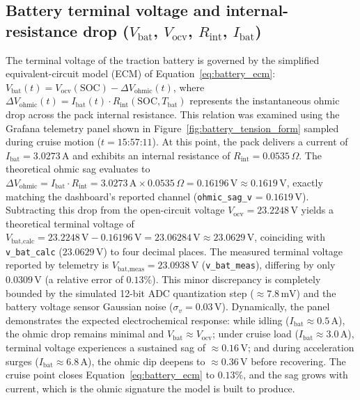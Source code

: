 \subsection{Battery terminal voltage and internal-resistance drop (\texorpdfstring{$V_{\mathrm{bat}}$, $V_{\mathrm{ocv}}$, $R_{\mathrm{int}}$, $I_{\mathrm{bat}}$}{Vbat, Vocv, Rint, Ibat})}
The terminal voltage of the traction battery is governed by the simplified equivalent-circuit model (ECM) of Equation~\eqref{eq:battery_ecm}: $V_{\text{bat}}(t) = V_{\text{ocv}}(\text{SOC}) - \Delta V_{\text{ohmic}}(t)$, where $\Delta V_{\text{ohmic}}(t) = I_{\text{bat}}(t) \cdot R_{\text{int}}(\text{SOC}, T_{\text{bat}})$ represents the instantaneous ohmic drop across the pack internal resistance. This relation was examined using the Grafana telemetry panel shown in Figure~\ref{fig:battery_tension_form} sampled during cruise motion ($t = \text{15:57:11}$). At this point, the pack delivers a current of $I_{\text{bat}} = 3.0273\,\text{A}$ and exhibits an internal resistance of $R_{\text{int}} = 0.0535\,\Omega$. The theoretical ohmic sag evaluates to $\Delta V_{\text{ohmic}} = I_{\text{bat}} \cdot R_{\text{int}} = 3.0273\,\text{A} \times 0.0535\,\Omega = 0.16196\,\text{V} \approx 0.1619\,\text{V}$, exactly matching the dashboard's reported channel (\texttt{ohmic\_sag\_v} = $0.1619\,\text{V}$). Subtracting this drop from the open-circuit voltage $V_{\text{ocv}} = 23.2248\,\text{V}$ yields a theoretical terminal voltage of $V_{\text{bat},\text{calc}} = 23.2248\,\text{V} - 0.16196\,\text{V} = 23.06284\,\text{V} \approx 23.0629\,\text{V}$, coinciding with \texttt{v\_bat\_calc} ($23.0629\,\text{V}$) to four decimal places. The measured terminal voltage reported by telemetry is $V_{\text{bat},\text{meas}} = 23.0938\,\text{V}$ (\texttt{v\_bat\_meas}), differing by only $0.0309\,\text{V}$ (a relative error of $0.13\%$). This minor discrepancy is completely bounded by the simulated 12-bit ADC quantization step ($\approx 7.8\,\text{mV}$) and the battery voltage sensor Gaussian noise ($\sigma_v = 0.03\,\text{V}$). Dynamically, the panel demonstrates the expected electrochemical response: while idling ($I_{\text{bat}} \approx 0.5\,\text{A}$), the ohmic drop remains minimal and $V_{\text{bat}} \approx V_{\text{ocv}}$; under cruise load ($I_{\text{bat}} \approx 3.0\,\text{A}$), terminal voltage experiences a sustained sag of $\approx 0.16\,\text{V}$; and during acceleration surges ($I_{\text{bat}} \approx 6.8\,\text{A}$), the ohmic dip deepens to $\approx 0.36\,\text{V}$ before recovering. The cruise point closes Equation~\eqref{eq:battery_ecm} to $0.13\%$, and the sag grows with current, which is the ohmic signature the model is built to produce.

